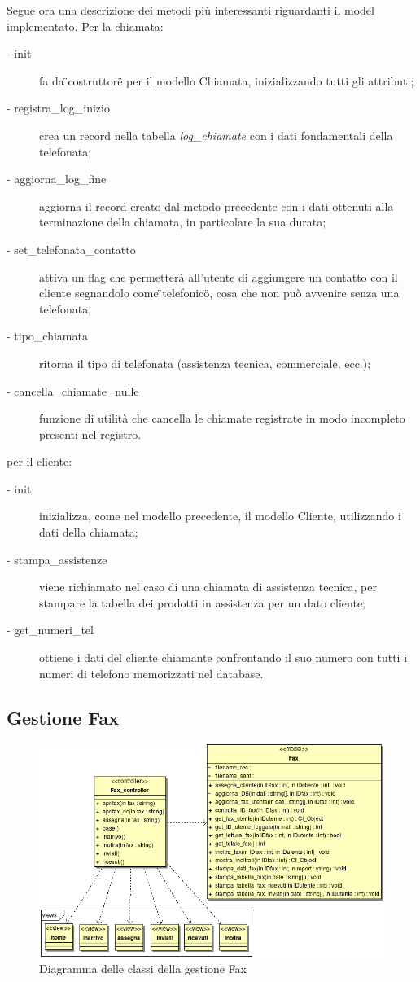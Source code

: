 Segue ora una descrizione dei metodi pi\`u interessanti riguardanti il model implementato.
Per la chiamata:
\begin{description}
\item[- init] fa da \"{}costruttore\"{} per il modello Chiamata, inizializzando tutti gli attributi;
\item[- registra\_{}log\_{}inizio] crea un record nella tabella \textit{log\_{}chiamate} con i dati fondamentali della telefonata;
\item[- aggiorna\_{}log\_{}fine] aggiorna il record creato dal metodo precedente con i dati ottenuti alla terminazione della chiamata, in particolare la sua durata;
\item[- set\_{}telefonata\_{}contatto] attiva un flag che permetter\`a all'utente di aggiungere un contatto con il cliente segnandolo come \"{}telefonico\"{}, cosa che non pu\`o avvenire senza una telefonata;
\item[- tipo\_{}chiamata] ritorna il tipo di telefonata (assistenza tecnica, commerciale, ecc.);
\item[- cancella\_{}chiamate\_{}nulle] funzione di utilit\`a che cancella le chiamate registrate in modo incompleto presenti nel registro.
 \end{description}

per il cliente:
\begin{description}
\item[- init] inizializza, come nel modello precedente, il modello Cliente, utilizzando i dati della chiamata;
\item[- stampa\_{}assistenze] viene richiamato nel caso di una chiamata di assistenza tecnica, per stampare la tabella dei prodotti in assistenza per un dato cliente;
\item[- get\_{}numeri\_{}tel] ottiene i dati del cliente chiamante confrontando il suo numero con tutti i numeri di telefono memorizzati nel database.
 \end{description}

\newpage
\subsection{Gestione Fax}
\begin{figure}[!ht]
\centering
  \includegraphics[scale=0.8]{./images/FaxMVC.png}
\caption{Diagramma delle classi della gestione Fax}
\label{fax}
\end{figure}

